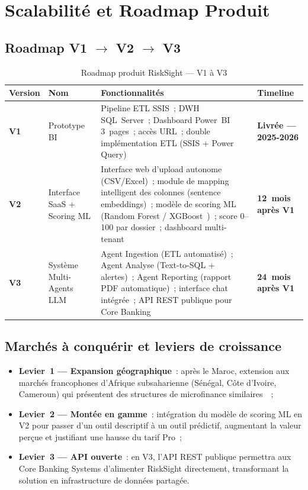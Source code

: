 \documentclass[12pt, a4paper]{report}
\begin{document}
\newpage
\section{Scalabilité et Roadmap Produit}

\subsection{Roadmap V1 \texorpdfstring{$\to$}{→} V2 \texorpdfstring{$\to$}{→} V3}

\begin{table}[H]
\centering
\caption{Roadmap produit RiskSight --- V1 à V3}
\label{tab:roadmap}
\renewcommand{\arraystretch}{1.5}
\begin{tabularx}{\textwidth}{p{1.5cm} p{2.5cm} X p{2.5cm}}
\toprule
\rowcolor{primary!12}
Version & Nom & Fonctionnalités & Timeline \\
\midrule
\textbf{V1} & Prototype BI & Pipeline ETL SSIS~; DWH SQL~Server~; Dashboard Power~BI 3~pages~; accès URL~; double implémentation ETL (SSIS + Power Query) & \textbf{Livrée --- 2025-2026} \\
\textbf{V2} & Interface SaaS + Scoring ML & Interface web d'upload autonome (CSV/Excel)~; module de mapping intelligent des colonnes (sentence embeddings)~; modèle de scoring ML (Random Forest / XGBoost~\cite{lessmann2015})~; score 0--100 par dossier~; dashboard multi-tenant & \textbf{12~mois après V1} \\
\textbf{V3} & Système Multi-Agents LLM & Agent Ingestion (ETL automatisé)~; Agent Analyse (Text-to-SQL + alertes)~; Agent Reporting (rapport PDF automatique)~; interface chat intégrée~; API REST publique pour Core Banking & \textbf{24~mois après V1} \\
\bottomrule
\end{tabularx}
\end{table}

\subsection{Marchés à conquérir et leviers de croissance}

\begin{itemize}[leftmargin=1.5em]
  \item \textbf{Levier~1 --- Expansion géographique}~: après le Maroc, extension
    aux marchés francophones d'Afrique subsaharienne (Sénégal, Côte d'Ivoire,
    Cameroun) qui présentent des structures de microfinance similaires~\cite{worldbank}~;
  \item \textbf{Levier~2 --- Montée en gamme}~: intégration du modèle de scoring
    ML en V2 pour passer d'un outil descriptif à un outil prédictif, augmentant
    la valeur perçue et justifiant une hausse du tarif Pro~;
  \item \textbf{Levier~3 --- API ouverte}~: en V3, l'API REST publique permettra
    aux Core Banking Systems d'alimenter RiskSight directement, transformant
    la solution en infrastructure de données partagée.
\end{itemize}
\end{document}
